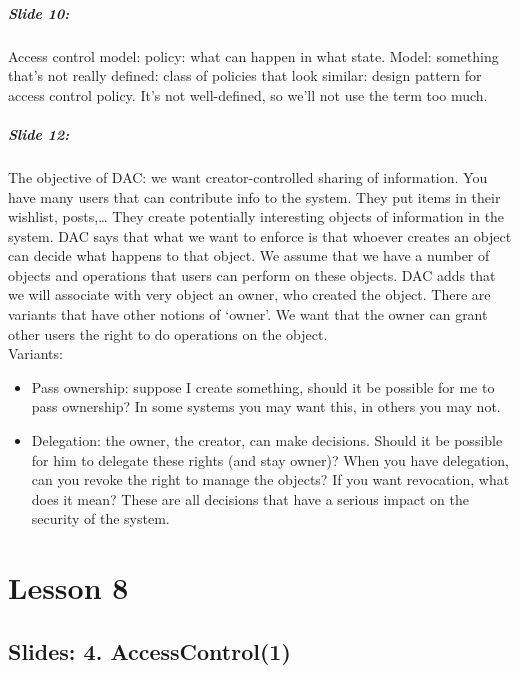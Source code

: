 \documentclass[10pt,a4paper]{report}
\begin{document}
\paragraph{Slide 10:} Access control model: policy: what can happen in what state. Model: something that's not really defined: class of policies that look similar: design pattern for access control policy. It's not well-defined, so we'll not use the term too much. 

\paragraph{Slide 12:} The objective of DAC: we want creator-controlled sharing of information. You have many users that can contribute info to the system. They put items in their wishlist, posts,… They create potentially interesting objects of information in the system. DAC says that what we want to enforce is that whoever creates an object can decide what happens to that object. We assume that we have a number of objects and operations that users can perform on these objects. DAC adds that we will associate with very object an owner, who created the object. There are variants that have other notions of `owner'. We want that the owner can grant other users the right to do operations on the object.\\
Variants:
\begin{itemize}
\item Pass ownership: suppose I create something, should it be possible for me to pass ownership? In some systems you may want this, in others you may not.
\item Delegation: the owner, the creator, can make decisions. Should it be possible for him to delegate these rights (and stay owner)? When you have delegation, can you revoke the right to manage the objects? If you want revocation, what does it mean? These are all decisions that have a serious impact on the security of the system.
\end{itemize}

\chapter{Lesson 8}

\section{Slides: 4. AccessControl(1)}
\end{document}
